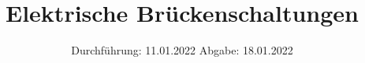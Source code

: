 

\subject{V302}
\title{Elektrische Brückenschaltungen}
\date{%
  Durchführung: 11.01.2022
  \hspace{3em}
  Abgabe: 18.01.2022
}



\maketitle
\thispagestyle{empty}
\tableofcontents
\newpage



\newpage




\printbibliography{}


